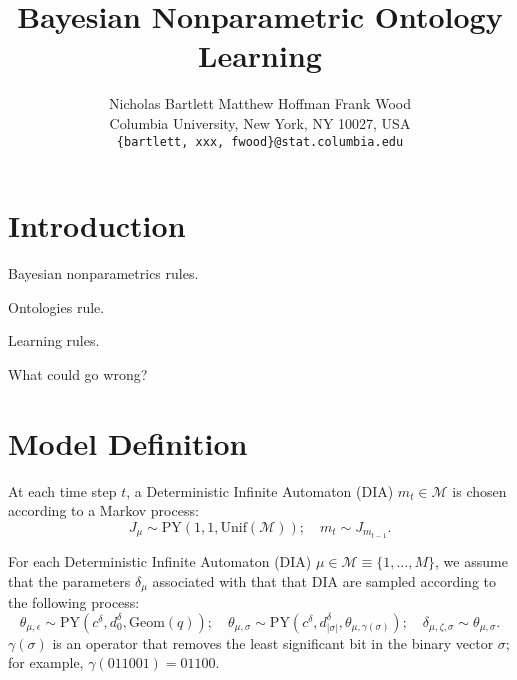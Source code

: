 \documentclass{article}
\title{Bayesian Nonparametric Ontology Learning}
\author{
Nicholas Bartlett \hspace{1cm} Matthew Hoffman \hspace{1cm} Frank Wood\\
Columbia University, New York, NY 10027, USA \\
\texttt{\{bartlett, xxx, fwood\}@stat.columbia.edu}
}
\newcommand{\PY}{\textrm{PY}}
\newcommand{\geom}{\textrm{Geom}}
\newcommand{\unif}{\textrm{Unif}}
\begin{document}
\maketitle

\section{Introduction}

Bayesian nonparametrics rules.

Ontologies rule.

Learning rules.

What could go wrong?

\section{Model Definition}


At each time step $t$, a Deterministic Infinite Automaton (DIA) $m_t
\in \mathcal{M}$ is chosen according to a Markov process:
\begin{equation}
J_\mu \sim \PY(1, 1, \unif(\mathcal{M}));\quad
m_t \sim J_{m_{t-1}}.
\end{equation}

For each Deterministic Infinite Automaton (DIA) $\mu \in \mathcal{M}
\equiv \{1,\ldots,M\}$, we assume that the parameters $\delta_\mu$
associated with that that DIA are sampled according to the following
process:
\begin{equation}
\theta_{\mu,\epsilon} \sim \PY(c^{\delta}, d^{\delta}_{0},\geom(q)); \quad
\theta_{\mu,\sigma} \sim \PY(c^{\delta}, d^{\delta}_{|\sigma|},
\theta_{\mu,\gamma(\sigma)}); \quad
\delta_{\mu,\zeta,\sigma} \sim \theta_{\mu,\sigma}.
\end{equation}
$\gamma(\sigma)$ is an operator that removes the least significant bit
in the binary vector $\sigma$; for example, $\gamma(011001)=01100$.
\end{document}
